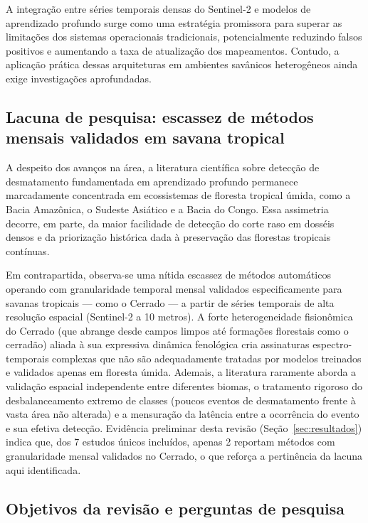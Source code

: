 \documentclass[12pt,a4paper]{article}
\begin{document}
A integração entre séries temporais densas do Sentinel-2 e modelos de aprendizado profundo surge como uma estratégia promissora para superar as limitações dos sistemas operacionais tradicionais, potencialmente reduzindo falsos positivos e aumentando a taxa de atualização dos mapeamentos. Contudo, a aplicação prática dessas arquiteturas em ambientes savânicos heterogêneos ainda exige investigações aprofundadas.

\subsection{Lacuna de pesquisa: escassez de métodos mensais validados em savana tropical}
\label{subsec:lacuna}

A despeito dos avanços na área, a literatura científica sobre detecção de desmatamento fundamentada em aprendizado profundo permanece marcadamente concentrada em ecossistemas de floresta tropical úmida, como a Bacia Amazônica, o Sudeste Asiático e a Bacia do Congo. Essa assimetria decorre, em parte, da maior facilidade de detecção do corte raso em dosséis densos e da priorização histórica dada à preservação das florestas tropicais contínuas.

Em contrapartida, observa-se uma nítida escassez de métodos automáticos operando com granularidade temporal mensal validados especificamente para savanas tropicais — como o Cerrado — a partir de séries temporais de alta resolução espacial (Sentinel-2 a 10 metros). A forte heterogeneidade fisionômica do Cerrado (que abrange desde campos limpos até formações florestais como o cerradão) aliada à sua expressiva dinâmica fenológica cria assinaturas espectro-temporais complexas que não são adequadamente tratadas por modelos treinados e validados apenas em floresta úmida. Ademais, a literatura raramente aborda a validação espacial independente entre diferentes biomas, o tratamento rigoroso do desbalanceamento extremo de classes (poucos eventos de desmatamento frente à vasta área não alterada) e a mensuração da latência entre a ocorrência do evento e sua efetiva detecção. Evidência preliminar desta revisão (Seção~\ref{sec:resultados}) indica que, dos 7 estudos únicos incluídos, apenas 2 reportam métodos com granularidade mensal validados no Cerrado, o que reforça a pertinência da lacuna aqui identificada.

\subsection{Objetivos da revisão e perguntas de pesquisa}
\label{subsec:objetivos}
\end{document}

